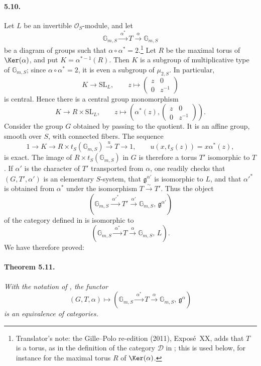 \paragraph{\textbf{5.10.}}
Let \(L\) be an invertible \(\mathcal O_S\)-module, and let
\[
 \mathbb G_{m,S}\xrightarrow{\ \alpha^\ast\ }T
 \xrightarrow{\ \alpha\ }\mathbb G_{m,S}
\]
be a diagram of groups such that
\(\alpha\circ\alpha^\ast=2\).\footnote{Translator's note: the Gille--Polo re-edition (2011), Exposé~XX, adds that \(T\) is a torus, as in the
definition of the category \(\mathcal D\) in ; this is used below, for
instance for the maximal torus \(R\) of \(\Ker(\alpha)\).}  Let \(R\) be the maximal torus of
\(\Ker(\alpha)\), and put \(K=\alpha^{\ast-1}(R)\).  Then \(K\) is a
subgroup of multiplicative type of \(\mathbb G_{m,S}\); since
\(\alpha\circ\alpha^\ast=2\), it is even a subgroup of
\(\mu_{2,S}\).  In particular,
\[
 K\longrightarrow\mathrm{SL}_L,
 \qquad
 z\longmapsto\begin{pmatrix}z&0\\0&z^{-1}\end{pmatrix}
\]
is central.  Hence there is a central group monomorphism
\[
 K\longrightarrow R\times\mathrm{SL}_L,
 \qquad
 z\longmapsto
 \left(
 \alpha^\ast(z),
 \begin{pmatrix}z&0\\0&z^{-1}\end{pmatrix}
 \right).
\]
Consider the group \(G\) obtained by passing to the quotient.
It is an affine group, smooth over \(S\), with connected fibers.
The sequence
\[
 1\longrightarrow K\longrightarrow
 R\times t_S(\mathbb G_{m,S})
 \xrightarrow{\ u\ }T\longrightarrow1,
 \qquad
 u(x,t_S(z))=x\alpha^\ast(z),
\]
is exact.  The image of \(R\times t_S(\mathbb G_{m,S})\) in \(G\)
is therefore a torus \(T'\) isomorphic to \(T\).  If \(\alpha'\) is
the character of \(T'\) transported from \(\alpha\), one readily
checks that \((G,T',\alpha')\) is an elementary \(S\)-system, that
\(\mathfrak g^{\alpha'}\) is isomorphic to \(L\), and that
\(\alpha'^\ast\) is obtained from \(\alpha^\ast\) under the
isomorphism \(T\xrightarrow{\sim}T'\).  Thus the object
\[
 \left(
 \mathbb G_{m,S}\xrightarrow{\ \alpha'^\ast\ }T'
 \xrightarrow{\ \alpha'\ }\mathbb G_{m,S},\,
 \mathfrak g^{\alpha'}
 \right)
\]
of the category defined in  is isomorphic to
\[
 \left(
 \mathbb G_{m,S}\xrightarrow{\ \alpha^\ast\ }T
 \xrightarrow{\ \alpha\ }\mathbb G_{m,S},\,L
 \right).
 \]
We have therefore proved:

\paragraph{\textbf{Theorem 5.11.}}
\emph{With the notation of , the functor}
\[
 (G,T,\alpha)\longmapsto
 \left(
 \mathbb G_{m,S}\xrightarrow{\ \alpha^\ast\ }T
 \xrightarrow{\ \alpha\ }\mathbb G_{m,S},\,
 \mathfrak g^\alpha
 \right)
\]
\emph{is an equivalence of categories.}

